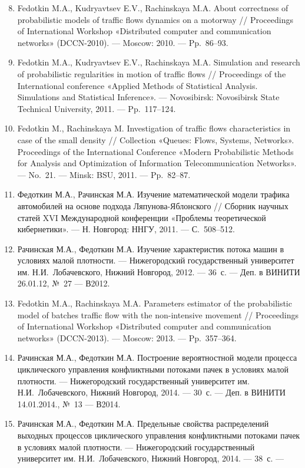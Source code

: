 \begin{enumerate}
	\setcounter{enumi}{7}
	\item Fedotkin M.A., Kudryavtsev E.V., Rachinskaya M.A. About correctness of probabilistic models of traffic flows dynamics on a motorway // Proceedings of International Workshop «Distributed computer and communication networks»
	(DCCN-2010). — Moscow: 2010. — Pp.~86–93.
	\item Fedotkin M.A., Kudryavtsev E.V., Rachinskaya M.A. Simulation and research of probabilistic regularities in motion of traffic flows // Proceedings of the International conference «Applied Methods of Statistical Analysis. Simulations and Statistical Inference». — Novosibirsk: Novosibirsk State Technical University, 2011. — Pp.~117–124.
	\item Fedotkin M., Rachinskaya M. Investigation of traffic flows characteristics in case of the small density // Collection «Queues: Flows, Systems, Networks».
	Proceedings of the International Conference «Modern Probabilistic Methods for Analysis and Optimization of Information Telecommunication Networks». — No.~21. — Minsk: BSU, 2011. — Pp.~82–87.
	\item Федоткин М.А., Рачинская М.А. Изучение математической модели трафика
	автомобилей на основе подхода Ляпунова-Яблонского // Сборник
	научных статей XVI Международной конференции «Проблемы теоретической кибернетики». — Н. Новгород: ННГУ, 2011. — С.~508–512.
	\item Рачинская М.А., Федоткин М.А. Изучение характеристик потока машин в условиях малой плотности. — Нижегородский государственный университет им. Н.И.~Лобачевского, Нижний Новгород, 2012. — 36~с. — Деп. в ВИНИТИ 26.01.12, №~27 — В2012.
	\item Fedotkin M.A., Rachinskaya M.A. Parameters estimator of the probabilistic model of batches traffic flow with the non-intensive movement // Proceedings of International Workshop «Distributed computer and communication networks»
	(DCCN-2013). — Moscow: 2013. — Pp.~357–364.
	\item Рачинская М.А., Федоткин М.А. Построение вероятностной модели процесса циклического управления конфликтными потоками пачек в условиях малой плотности. — Нижегородский государственный университет им.
	Н.И.~Лобачевского, Нижний Новгород, 2014. — 30~с. — Деп. в ВИНИТИ 14.01.2014., №~13 — В2014.
	\item Рачинская М.А., Федоткин М.А. Предельные свойства распределений выходных процессов циклического управления конфликтными потоками пачек в условиях малой плотности. — Нижегородский государственный университет им. Н.И.~Лобачевского, Нижний Новгород, 2014. — 38~с. —

\end{enumerate}
